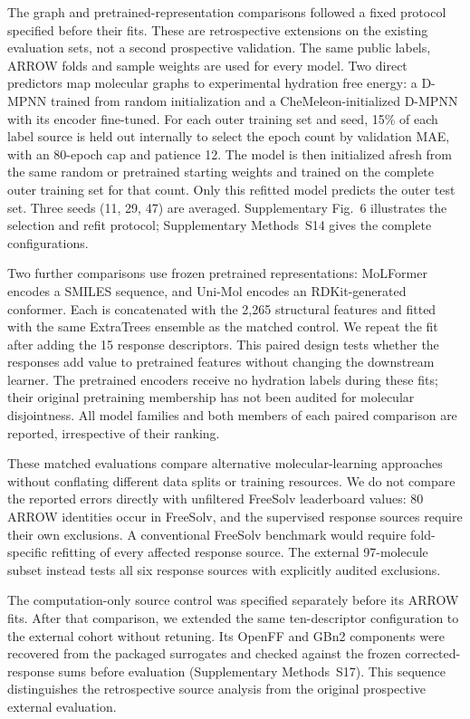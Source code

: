 \documentclass[12pt]{article}
\begin{document}
The graph and pretrained-representation comparisons followed a fixed protocol
specified before their fits. These are
retrospective extensions on the existing evaluation sets, not a second prospective
validation. The same public labels, ARROW folds and sample weights are used for every
model. Two direct predictors map molecular graphs to experimental hydration free
energy: a D-MPNN trained from random initialization and a CheMeleon-initialized
D-MPNN with its encoder fine-tuned.\cite{chemprop2019,chemeleon2025}
For each outer training set and seed, 15\% of each label source is held out internally
to select the epoch count by validation MAE, with an 80-epoch cap and patience 12.
The model is then initialized afresh from the same random or pretrained starting
weights and trained on the complete outer training set
for that count. Only this refitted model predicts the outer test set. Three seeds
(11, 29, 47) are averaged. Supplementary Fig.~6 illustrates the selection and refit
protocol; Supplementary Methods~S14 gives the complete configurations.

Two further comparisons use frozen pretrained representations: MoLFormer encodes
a SMILES sequence, and Uni-Mol encodes an RDKit-generated conformer.\cite{molformer2022,unimol2023}
Each is concatenated with the 2,265 structural features and fitted with the same
ExtraTrees ensemble as the matched control. We repeat the fit after adding the 15
response descriptors. This paired design tests whether the responses add value to
pretrained features without changing the downstream learner. The pretrained encoders
receive no hydration labels during these fits; their original pretraining membership
has not been audited for molecular disjointness. All model families and both members
of each paired comparison are reported, irrespective of their ranking.

These matched evaluations compare alternative molecular-learning approaches without
conflating different data splits or training resources.\cite{moleculenet2018}
We do not compare the reported errors directly with unfiltered FreeSolv leaderboard
values: 80 ARROW identities occur in FreeSolv, and the supervised response sources
require their own exclusions. A conventional FreeSolv benchmark would require
fold-specific refitting of every affected response source. The external 97-molecule
subset instead tests all six response sources with explicitly audited exclusions.

The computation-only source control was specified separately before its ARROW fits.
After that comparison, we extended the same ten-descriptor configuration to the
external cohort without retuning. Its OpenFF and GBn2 components were recovered from
the packaged surrogates and checked against the frozen corrected-response sums before
evaluation (Supplementary Methods~S17). This sequence distinguishes the retrospective
source analysis from the original prospective external evaluation.
\end{document}
